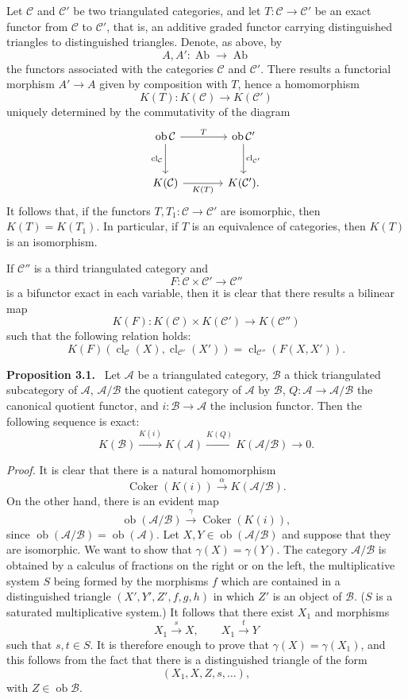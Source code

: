 \documentclass[11pt]{article}
\newenvironment{statement}[1]{\par\medskip\noindent\textbf{#1.}\ }{\par\medskip}
\providecommand{\Ob}{\operatorname{ob}}
\providecommand{\cC}{\mathcal C}
\providecommand{\Ob}{\operatorname{ob}}
\providecommand{\Ab}{\operatorname{Ab}}
\providecommand{\cC}{\mathcal C}
\providecommand{\cA}{\mathcal A}
\providecommand{\cB}{\mathcal B}
\providecommand{\Ab}{\operatorname{Ab}}
\providecommand{\Ob}{\operatorname{Ob}}
\providecommand{\Ob}{\operatorname{ob}}
\begin{document}
Let $\cC$ and $\cC'$ be two triangulated categories, and let $T:\cC\to\cC'$ be an exact functor from $\cC$ to $\cC'$, that is, an additive graded functor carrying distinguished triangles to distinguished triangles. Denote, as above, by
\[
A,A':\Ab\longrightarrow\Ab
\]
the functors associated with the categories $\cC$ and $\cC'$. There results a functorial morphism $A'\to A$ given by composition with $T$, hence a homomorphism
\[
K(T):K(\cC)\longrightarrow K(\cC')
\]
uniquely determined by the commutativity of the diagram
\[
\begin{tikzcd}[column sep=large,row sep=large]
\Ob\cC \arrow[r,"T"] \arrow[d,"\operatorname{cl}_{\cC}"']&
\Ob\cC' \arrow[d,"\operatorname{cl}_{\cC'}"]\\
K(\cC) \arrow[r,"K(T)"']& K(\cC').
\end{tikzcd}
\]
It follows that, if the functors $T,T_1:\cC\to\cC'$ are isomorphic, then $K(T)=K(T_1)$. In particular, if $T$ is an equivalence of categories, then $K(T)$ is an isomorphism.

If $\cC''$ is a third triangulated category and
\[
F:\cC\times\cC'\longrightarrow \cC''
\]
is a bifunctor exact in each variable, then it is clear that there results a bilinear map
\[
K(F):K(\cC)\times K(\cC')\longrightarrow K(\cC'')
\]
such that the following relation holds:
\[
K(F)(\operatorname{cl}_{\cC}(X),\operatorname{cl}_{\cC'}(X'))
=
\operatorname{cl}_{\cC''}(F(X,X')).
\]

\begin{statement}{Proposition 3.1}
Let $\cA$ be a triangulated category, $\cB$ a thick triangulated subcategory of $\cA$, $\cA/\cB$ the quotient category of $\cA$ by $\cB$, $Q:\cA\to\cA/\cB$ the canonical quotient functor, and $i:\cB\to\cA$ the inclusion functor. Then the following sequence is exact:
\[
K(\cB)\xrightarrow{K(i)}K(\cA)\xrightarrow{K(Q)}K(\cA/\cB)\longrightarrow 0.
\]
\end{statement}

\emph{Proof.} It is clear that there is a natural homomorphism
\[
\operatorname{Coker}(K(i))\xrightarrow{\alpha}K(\cA/\cB).
\]
On the other hand, there is an evident map
\[
\Ob(\cA/\cB)\xrightarrow{\gamma}\operatorname{Coker}(K(i)),
\]
since $\Ob(\cA/\cB)=\Ob(\cA)$. Let $X,Y\in\Ob(\cA/\cB)$ and suppose that they are isomorphic. We want to show that $\gamma(X)=\gamma(Y)$. The category $\cA/\cB$ is obtained by a calculus of fractions on the right or on the left, the multiplicative system $S$ being formed by the morphisms $f$ which are contained in a distinguished triangle $(X',Y',Z',f,g,h)$ in which $Z'$ is an object of $\cB$. ($S$ is a saturated multiplicative system.) It follows that there exist $X_1$ and morphisms
\[
X_1\xrightarrow{s}X,\qquad X_1\xrightarrow{t}Y
\]
such that $s,t\in S$. It is therefore enough to prove that $\gamma(X)=\gamma(X_1)$, and this follows from the fact that there is a distinguished triangle of the form
\[
(X_1,X,Z,s,\ldots),
\]
with $Z\in\Ob\cB$.
\end{document}
